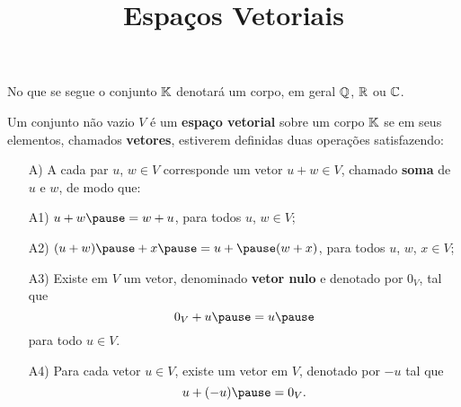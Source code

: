 \documentclass{beamer}
\title{Espaços Vetoriais}
\author[\autor]{\autor}
\institute[\instituto]{\instituto}
\date{}
\begin{document}
    \begin{frame}
        \maketitle
    \end{frame}


    \begin{frame}
        No que se segue o conjunto $\mathbb{K}$ denotar\'a um corpo, em geral $\mathbb{Q}$, $\mathbb{R}$ ou $\mathbb{C}$.

        \vspace{.3cm}

        \begin{definicao}
    	    Um conjunto	n\~ao vazio $V$ \pause \'e um \textbf{espa\c{c}o vetorial} \pause sobre um corpo $\mathbb{K}$ \pause se em seus elementos, chamados \textbf{vetores}, \pause estiverem definidas duas 
    	    opera\c{c}\~oes satisfazendo:\pause
    	    \begin{itemize}
        		\item[A)] A cada par $u$, $w \in V$ \pause corresponde um vetor $u + w \in V$, \pause chamado \textbf{soma} de $u$ e $w$, de modo que:\pause 

                \vspace{.3cm}

		        \item[A1)] $u + w \pause = w + u$, \pause para todos $u$, $w \in V$;\pause 
	
                \vspace{.3cm}

        	    \item[A2)] $(u + w) \pause + x \pause = u + \pause (w + x)$, \pause para todos $u$, $w$, $x \in V$;
	    	\end{itemize}
	    \end{definicao}
	\end{frame}

	\begin{frame}
	    \begin{definicao}
	        \begin{itemize}
        		\item[A3)] Existe em $V$ um vetor, \pause denominado \textbf{vetor nulo} \pause e denotado por $0_V$, tal que\pause 
	    	    \[
	        		0_V + u \pause = u\pause 
    		    \]
    		    para todo $u \in V$.\pause 
	
                \vspace{.3cm}

             	\item[A4)] Para cada vetor $u \in V$, \pause existe um vetor em $V$, \pause denotado por $-u$ tal que\pause 
    	    	\[
		        	u + (-u) \pause = 0_V.
    	    	\]
	    	\end{itemize}
	    \end{definicao}
	\end{frame}
\end{document}

